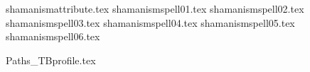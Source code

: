 

\tablelabels
{shamanismattribute.tex}%
\spellrule
{shamanismspell01.tex}%
\spellrule
{shamanismspell02.tex}%
\spellrule
{shamanismspell03.tex}%
\spellrule
{shamanismspell04.tex}%
\spellrule
{shamanismspell05.tex}%
\spellrule
{shamanismspell06.tex}%
\closetable{}

\vfill

\newcommand{\totemicbeastname}{\totemicbeast}

{Paths_TBprofile.tex}%
\vfill
